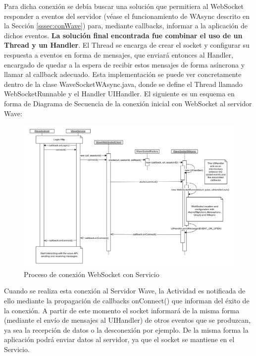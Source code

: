     Para dicha conexión se debía buscar una solución que permitiera al WebSocket responder a eventos del servidor (véase el funcionamiento de WAsync descrito en la Sección \ref{sssec:conWave}) para, mediante callbacks, informar a la aplicación de dichos eventos. \textbf{La solución final encontrada fue combinar el uso de un Thread y un Handler}. El Thread se encarga de crear el socket y configurar su respuesta a eventos en forma de mensajes, que enviará entonces al Handler, encargado de quedar a la espera de recibir estos mensajes de forma asíncrona y llamar al callback adecuado. Esta implementación se puede ver concretamente dentro de la clase WaveSocketWAsync.java, donde se define el Thread llamado WebSocketRunnable y el Handler UIHandler. El siguiente es un esquema en forma de Diagrama de Secuencia de la conexión inicial con WebSocket al servidor Wave:
    
  \begin{figure}[H]
   \centering
	\includegraphics[keepaspectratio, scale=0.43]{Media/Diagrams/waveServerConnectionSequenceDiagram.png}
    \caption{Proceso de conexión WebSocket con Servicio}
   \label{fig:sequenceDiagram_waveWebSocket}
  \end{figure}
     
      Cuando se realiza esta conexión al Servidor Wave, la Actividad es notificada de ello mediante la propagación de callbacks onConnect() que informan del éxito de la conexión. A partir de este momento el socket informará de la misma forma (mediante el envío de mensajes al UIHandler) de otros eventos que se produzcan, ya sea la recepción de datos o la desconexión por ejemplo. De la misma forma la aplicación podrá enviar datos al servidor, ya que el socket se mantiene en el Servicio. 
      
